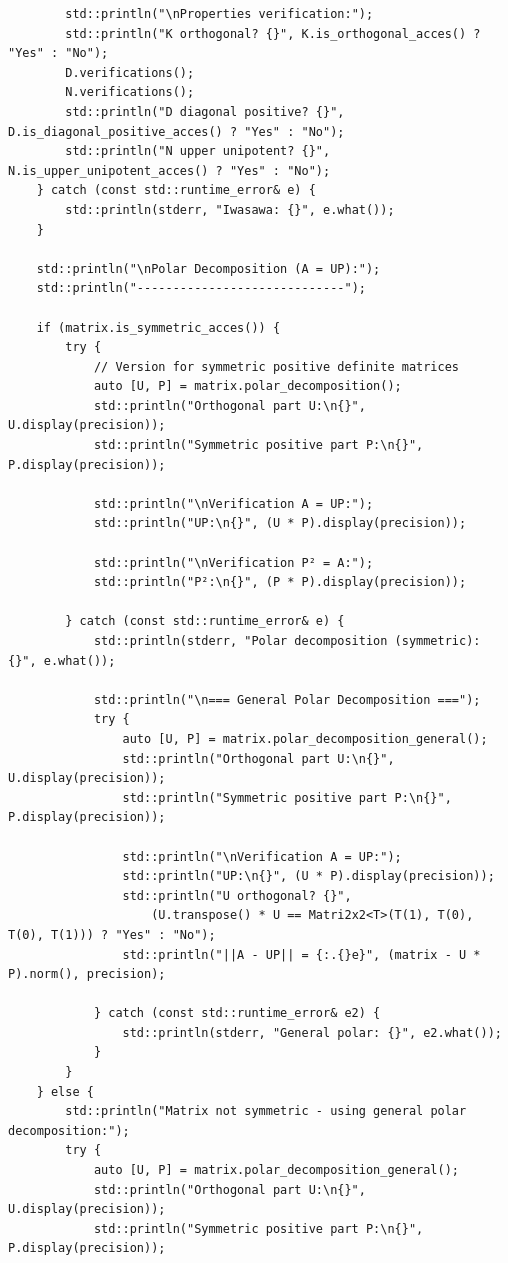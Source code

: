 \documentclass[11pt]{article}
\begin{document}
\begin{lstlisting}
        std::println("\nProperties verification:");
        std::println("K orthogonal? {}", K.is_orthogonal_acces() ? "Yes" : "No");
        D.verifications();
        N.verifications();
        std::println("D diagonal positive? {}", D.is_diagonal_positive_acces() ? "Yes" : "No");
        std::println("N upper unipotent? {}", N.is_upper_unipotent_acces() ? "Yes" : "No");
    } catch (const std::runtime_error& e) {
        std::println(stderr, "Iwasawa: {}", e.what());
    }

    std::println("\nPolar Decomposition (A = UP):");
    std::println("-----------------------------");

    if (matrix.is_symmetric_acces()) {
        try {
            // Version for symmetric positive definite matrices
            auto [U, P] = matrix.polar_decomposition();
            std::println("Orthogonal part U:\n{}", U.display(precision));
            std::println("Symmetric positive part P:\n{}", P.display(precision));
            
            std::println("\nVerification A = UP:");
            std::println("UP:\n{}", (U * P).display(precision));
            
            std::println("\nVerification P² = A:");
            std::println("P²:\n{}", (P * P).display(precision));
            
        } catch (const std::runtime_error& e) {
            std::println(stderr, "Polar decomposition (symmetric): {}", e.what());
            
            std::println("\n=== General Polar Decomposition ===");
            try {
                auto [U, P] = matrix.polar_decomposition_general();
                std::println("Orthogonal part U:\n{}", U.display(precision));
                std::println("Symmetric positive part P:\n{}", P.display(precision));
                
                std::println("\nVerification A = UP:");
                std::println("UP:\n{}", (U * P).display(precision));
                std::println("U orthogonal? {}", 
                    (U.transpose() * U == Matri2x2<T>(T(1), T(0), T(0), T(1))) ? "Yes" : "No");
                std::println("||A - UP|| = {:.{}e}", (matrix - U * P).norm(), precision);
                
            } catch (const std::runtime_error& e2) {
                std::println(stderr, "General polar: {}", e2.what());
            }
        }
    } else {
        std::println("Matrix not symmetric - using general polar decomposition:");
        try {
            auto [U, P] = matrix.polar_decomposition_general();
            std::println("Orthogonal part U:\n{}", U.display(precision));
            std::println("Symmetric positive part P:\n{}", P.display(precision));
            

\end{lstlisting}
\end{document}
